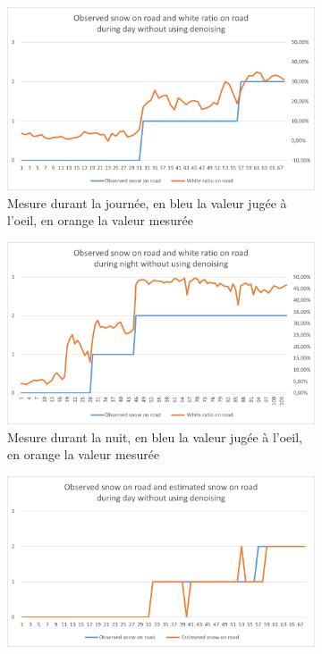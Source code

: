 \begin{figure}[H]
    \begin{subfigure}{.45\textwidth}
        \includegraphics[width=\linewidth]{Images/computer_vision/snowOnRoad/dayMes_noise.png}
        \caption{Mesure durant la journée, en bleu la valeur jugée à l'oeil, en orange la valeur mesurée}
        \label{fig:SnowOnRoad_noise_dayMes}
    \end{subfigure}
    \hfill
    \begin{subfigure}{.45\textwidth}
        \includegraphics[width=\linewidth]{Images/computer_vision/snowOnRoad/nightMes_noise.png}
        \caption{Mesure durant la nuit, en bleu la valeur jugée à l'oeil, en orange la valeur mesurée}
        \label{fig:SnowOnRoad_noise_nightMes}
    \end{subfigure}
    \hfill
    \begin{subfigure}{.45\textwidth}
        \includegraphics[width=\linewidth]{Images/computer_vision/snowOnRoad/dayResults_noise.png}

\end{subfigure}
\end{figure}
